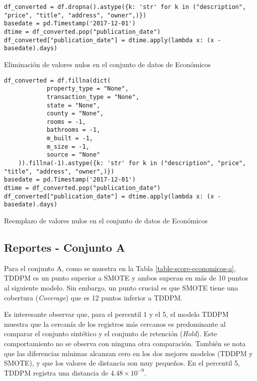 \begin{listing}[H]
    \begin{verbatim}
df_converted = df.dropna().astype({k: 'str' for k in ("description", "price", "title", "address", "owner",)})
basedate = pd.Timestamp('2017-12-01')
dtime = df_converted.pop("publication_date")
df_converted["publication_date"] = dtime.apply(lambda x: (x - basedate).days)
    \end{verbatim}
\caption{Eliminación de valores nulos en el conjunto de datos de Económicos}
\label{codigo-remove-nan}
\end{listing}

\begin{listing}[H]
    \begin{verbatim}
df_converted = df.fillna(dict(
            property_type = "None",
            transaction_type = "None",
            state = "None",
            county = "None",
            rooms = -1,
            bathrooms = -1,
            m_built = -1,
            m_size = -1,
            source = "None"
    )).fillna(-1).astype({k: 'str' for k in ("description", "price", "title", "address", "owner",)})
basedate = pd.Timestamp('2017-12-01')
dtime = df_converted.pop("publication_date")
df_converted["publication_date"] = dtime.apply(lambda x: (x - basedate).days)
    \end{verbatim}
\caption{Reemplazo de valores nulos en el conjunto de datos de Económicos}
\label{codigo-replace-nan}
\end{listing}

\newpage
\subsection{Reportes - Conjunto A}
\label{ds-conjunto-a}
Para el conjunto A, como se muestra en la Tabla \ref{table-score-economicos-a}, TDDPM es un punto superior a SMOTE y ambos superan en más de 10 puntos al siguiente modelo. Sin embargo, un punto crucial es que SMOTE tiene una cobertura (\emph{Coverage}) que es 12 puntos inferior a TDDPM.



\newpage
Es interesante observar que, para el percentil 1 y el 5, el modelo TDDPM muestra que la cercanía de los registros más cercanos es predominante al comparar el conjunto sintético y el conjunto de retención (\emph{Hold}). Este comportamiento no se observa con ninguna otra comparación. También se nota que las diferencias mínimas alcanzan cero en los dos mejores modelos (TDDPM y SMOTE), y que los valores de distancia son muy pequeños. En el percentil 5, TDDPM registra una distancia de $4.48 \times 10^{-9}$.


